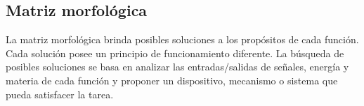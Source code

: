 \subsection{Matriz morfológica}

La matriz morfológica brinda posibles soluciones a los propósitos de cada función. Cada solución posee un principio de funcionamiento diferente. La búsqueda de posibles soluciones se basa en analizar las entradas/salidas de señales, energía y materia de cada función y proponer un dispositivo, mecanismo o sistema que pueda satisfacer la tarea.\cite[p.~181-184]{Pahl2007}

\newpage
\pagestyle{mylandscape}

\begin{landscape}
	

\end{landscape}
